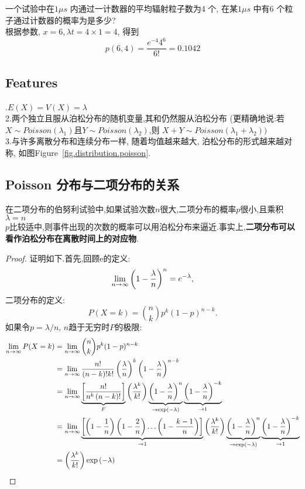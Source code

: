 \documentclass{article}
\begin{document}
\begin{example}
一个试验中在$1 \mu s$ 内通过一计数器的平均辐射粒子数为4 个, 在某$1\mu s$ 中有6 个粒子通过计数器的概率为是多少?\\
根据参数, $x=6, \lambda t = 4 \times 1=4$, 得到
$$ p(6,4) = \frac{e^{-4} 4^6}{6!} = 0.1042 $$
\end{example}

\subsection{Features}	
.$E(X)=V(X)=\lambda$ \\
2.两个独立且服从泊松分布的随机变量,其和仍然服从泊松分布 (更精确地说:若$X \sim Poisson(\lambda_1)$且$Y \sim Poisson(\lambda_2)$,则 $X+Y \sim Poisson(\lambda_1+\lambda_2))$\\
3.与许多离散分布和连续分布一样, 随着均值越来越大, 泊松分布的形式越来越对称, 如图Figure~\ref{fig.distribution.poisson}.

\subsection{Poisson 分布与二项分布的关系}
在二项分布的伯努利试验中,如果试验次数$n$很大,二项分布的概率$p$很小,且乘积$\lambda = n$ \\$p$比较适中,则事件出现的次数的概率可以用泊松分布来逼近.事实上,\textbf{二项分布可以看作泊松分布在离散时间上的对应物}.
\begin{proof}
证明如下.首先,回顾e的定义:
$$
\lim _{{n\to \infty }}\left(1-{\lambda  \over n}\right)^{n}=e^{{-\lambda }},
$$
二项分布的定义:
$$
P(X=k)={n \choose k}p^{k}(1-p)^{{n-k}}.
$$
如果令$p=\lambda /n$, $n$趋于无穷时$P$的极限:
$$
\begin{aligned}
\lim_{{n \to \infty }}P(X=k) & =\lim _{{n\to \infty }}{n \choose k}p^{k}(1-p)^{{n-k}}\\
& = \lim _{{n\to \infty }}{n! \over (n-k)!k!}\left({\lambda \over n}\right)^{k}\left(1-{\lambda \over n}\right)^{{n-k}}\\
& = \lim _{{n\to \infty }}\underbrace {\left[{\frac {n!}{n^{k}\left(n-k\right)!}}\right]}_{F}\left({\frac {\lambda ^{k}}{k!}}\right)\underbrace {\left(1-{\frac {\lambda }{n}}\right)^{n}}_{{\to \exp \left(-\lambda \right)}}\underbrace {\left(1-{\frac {\lambda }{n}}\right)^{{-k}}}_{{\to 1}}\\
& = \lim _{{n\to \infty }}\underbrace {\left[\left(1-{\frac {1}{n}}\right)\left(1-{\frac {2}{n}}\right)\ldots \left(1-{\frac {k-1}{n}}\right)\right]}_{{\to 1}}\left({\frac {\lambda ^{k}}{k!}}\right)\underbrace {\left(1-{\frac {\lambda }{n}}\right)^{n}}_{{\to \exp \left(-\lambda \right)}}\underbrace {\left(1-{\frac {\lambda }{n}}\right)^{{-k}}}_{{\to 1}}\\
& = \left({\frac {\lambda ^{k}}{k!}}\right)\exp \left(-\lambda \right)
\end{aligned}
$$
\end{proof}
\end{document}

